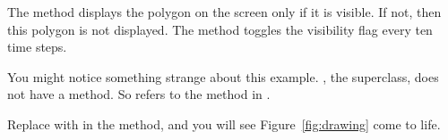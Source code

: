 The  method displays the polygon on the screen only if it is visible.
If not, then this polygon is not displayed.
The  method toggles the visibility flag every ten time steps.

You might notice something strange about this example.
, the superclass, does not have a  method.
So  refers to the  method in .

Replace  with  in the  method, and you will see Figure~\ref{fig:drawing} come to life.

